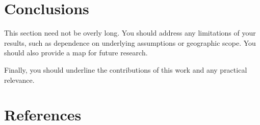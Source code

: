 \documentclass[
  letterpaper,
  authoryear]{elsarticle}
\begin{document}

\hypertarget{conclusions}{%
\section{Conclusions}\label{conclusions}}

This section need not be overly long. You should address any limitations
of your results, such as dependence on underlying assumptions or
geographic scope. You should also provide a map for future research.

Finally, you should underline the contributions of this work and any
practical relevance.


\hypertarget{references}{%
\section*{References}\label{references}}


\renewcommand{\bibsection}{}

\end{document}
